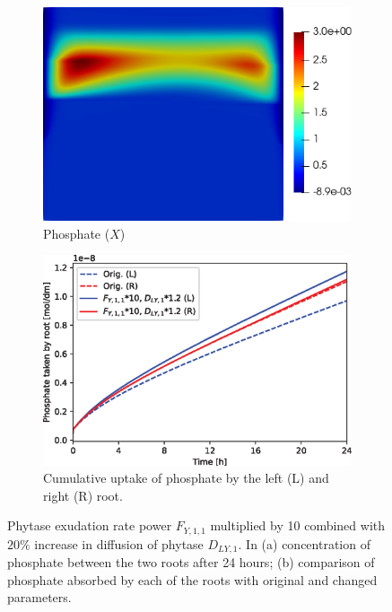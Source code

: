 \documentclass[11pt]{article}
\numberwithin{equation}{section}
\begin{document}
\begin{figure}[!htb]
\centering
\begin{subfigure}[t]{0.35\textwidth}
    \includegraphics[width=\textwidth]{Figures/X_Fy11times10Y1up20pc.png}
    \caption{Phosphate ($X$)}
\end{subfigure}
\hspace{1cm}
\begin{subfigure}[t]{0.45\textwidth}
    \includegraphics[width=\textwidth]{Figures/Fy11times10DY1up20pc.eps}
    \caption{Cumulative uptake of phosphate by the left (L) and right (R) root.}
\end{subfigure}

\caption{Phytase exudation rate power $F_{Y,1,1}$ multiplied by 10 combined with $20\%$ increase in diffusion of phytase $D_{LY,1}$. In (a) concentration of phosphate between the two roots after 24 hours; (b) comparison of phosphate absorbed by each of the roots with original and changed parameters.}
\end{figure}
\end{document}
